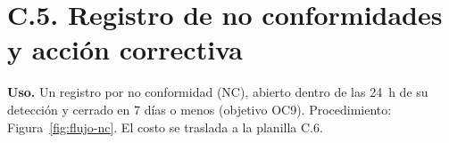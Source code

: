 \clearpage
\section*{C.5. Registro de no conformidades y acción correctiva}

{\small
\textbf{Uso.} Un registro por no conformidad (NC), abierto dentro de las 24~h de su detección y cerrado en 7 días o menos (objetivo OC9). Procedimiento: Figura~\ref{fig:flujo-nc}. El costo se traslada a la planilla C.6.\par}


